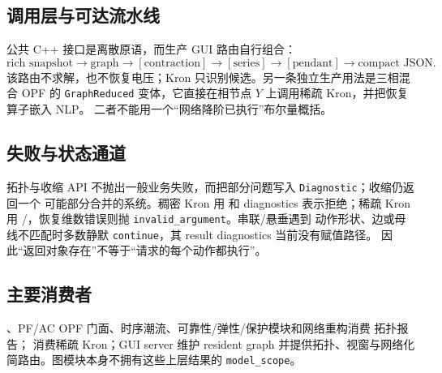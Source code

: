 \subsection{调用层与可达流水线}

公共 C++ 接口是离散原语，而生产 GUI 路由自行组合：
\begin{equation}
\text{rich snapshot}\to\text{graph}\to
[\text{contraction}]\to[\text{series}]\to[\text{pendant}]
\to\text{compact JSON}.
\end{equation}
该路由不求解，也不恢复电压；Kron 只识别候选。另一条独立生产用法是三相混合 OPF 的
\texttt{GraphReduced} 变体，它直接在相节点 $Y$ 上调用稀疏 Kron，并把恢复算子嵌入 NLP。
二者不能用一个“网络降阶已执行”布尔量概括。

\subsection{失败与状态通道}

拓扑与收缩 API 不抛出一般业务失败，而把部分问题写入 \texttt{Diagnostic}；收缩仍返回一个
可能部分合并的系统。稠密 Kron 用  和 diagnostics 表示拒绝；稀疏 Kron
用 /，恢复维数错误则抛 \texttt{invalid\_argument}。串联/悬垂遇到
动作形状、边或母线不匹配时多数静默 \texttt{continue}，其 result diagnostics 当前没有赋值路径。
因此“返回对象存在”不等于“请求的每个动作都执行”。

\subsection{主要消费者}

、PF/AC OPF 门面、时序潮流、可靠性/弹性/保护模块和网络重构消费
拓扑报告； 消费稀疏 Kron；GUI server 维护 resident graph
并提供拓扑、视窗与网络化简路由。图模块本身不拥有这些上层结果的 \texttt{model\_scope}。
